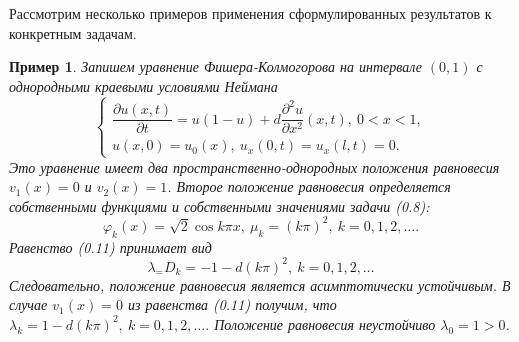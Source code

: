 \documentclass[9pt, a4paper]{extarticle}
\newtheorem{sample}{Пример}
\numberwithin{equation}{section}
\numberwithin{lemma}{section}
\numberwithin{definition}{section}
\numberwithin{notabene}{section}
\numberwithin{corollary}{section}
\begin{document}
	Рассмотрим несколько примеров применения сформулированных результатов к конкретным задачам.
	\begin{sample}
		Запишем уравнение Фишера-Колмогорова на интервале $(0,1)$ с однородными краевыми условиями Неймана
		\begin{equation*}
			\begin{cases}
				\dfrac{\partial u(x,t)}{\partial t} = u(1-u) + d \dfrac{\partial^2 u}{\partial x^2}(x,t), \ 0 < x < 1,\\
				u(x,0) = u_0(x), \ u_x(0,t) = u_x(l,t) = 0.
			\end{cases}
		\end{equation*}
		Это уравнение имеет два пространственно-однородных положения равновесия $v_1(x) = 0$ и $v_2(x) = 1$. Второе положение равновесия определяется собственными функциями и собственными значениями задачи (0.8):
		\begin{equation*}
			\varphi_k(x) = \sqrt2 \cos{k\pi x}, \ \mu_k = \left(k\pi\right)^2, \ k = 0,1, 2, \dots .
		\end{equation*}
		Равенство (0.11) принимает вид
		\begin{equation*}
			\lambda_ = D_k = -1 -d\left(k\pi\right)^2, \ k =0,1 ,2,\dots
		\end{equation*}
		Следовательно, положение равновесия является асимптотически устойчивым. \newline
		В случае $v_1(x) = 0$ из равенства (0.11) получим, что  $\lambda_k = 1 - d\left(k\pi\right)^2, \ k = 0,1,2,\dots.$\newline
		Положение равновесия неустойчиво $\lambda_0  = 1 > 0$.
	\end{sample}
	
\end{document}
